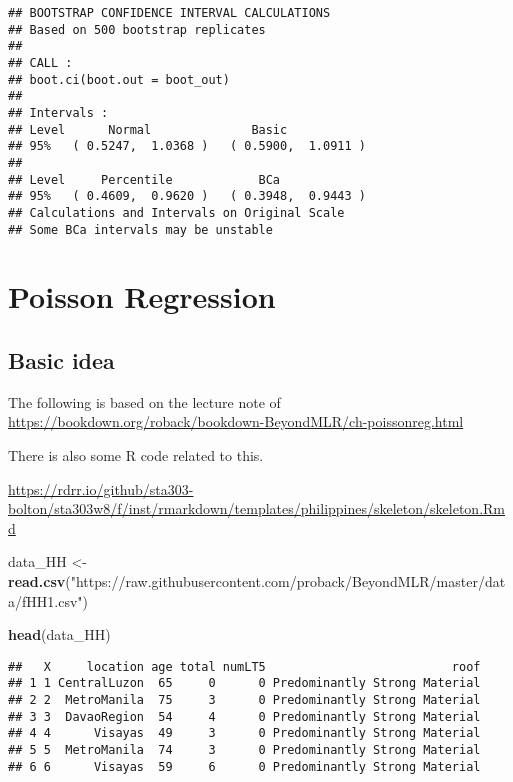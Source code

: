 \documentclass[]{book}
\newenvironment{Shaded}{\begin{snugshade}}{\end{snugshade}}
\newcommand{\KeywordTok}[1]{\textcolor[rgb]{0.13,0.29,0.53}{\textbf{#1}}}
\newcommand{\NormalTok}[1]{#1}
\newcommand{\StringTok}[1]{\textcolor[rgb]{0.31,0.60,0.02}{#1}}
\begin{document}
\begin{verbatim}
## BOOTSTRAP CONFIDENCE INTERVAL CALCULATIONS
## Based on 500 bootstrap replicates
## 
## CALL : 
## boot.ci(boot.out = boot_out)
## 
## Intervals : 
## Level      Normal              Basic         
## 95%   ( 0.5247,  1.0368 )   ( 0.5900,  1.0911 )  
## 
## Level     Percentile            BCa          
## 95%   ( 0.4609,  0.9620 )   ( 0.3948,  0.9443 )  
## Calculations and Intervals on Original Scale
## Some BCa intervals may be unstable
\end{verbatim}

\hypertarget{poisson-regression}{%
\chapter{Poisson Regression}\label{poisson-regression}}

\hypertarget{basic-idea}{%
\section{Basic idea}\label{basic-idea}}

The following is based on the lecture note of \url{https://bookdown.org/roback/bookdown-BeyondMLR/ch-poissonreg.html}

There is also some R code related to this.

\url{https://rdrr.io/github/sta303-bolton/sta303w8/f/inst/rmarkdown/templates/philippines/skeleton/skeleton.Rmd}

\begin{Shaded}
\begin{Highlighting}[]
\NormalTok{data_HH <-}\StringTok{ }\KeywordTok{read.csv}\NormalTok{(}\StringTok{"https://raw.githubusercontent.com/proback/BeyondMLR/master/data/fHH1.csv"}\NormalTok{)}

\KeywordTok{head}\NormalTok{(data_HH)}
\end{Highlighting}
\end{Shaded}

\begin{verbatim}
##   X     location age total numLT5                          roof
## 1 1 CentralLuzon  65     0      0 Predominantly Strong Material
## 2 2  MetroManila  75     3      0 Predominantly Strong Material
## 3 3  DavaoRegion  54     4      0 Predominantly Strong Material
## 4 4      Visayas  49     3      0 Predominantly Strong Material
## 5 5  MetroManila  74     3      0 Predominantly Strong Material
## 6 6      Visayas  59     6      0 Predominantly Strong Material
\end{verbatim}
\end{document}

